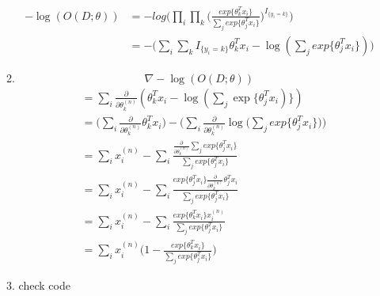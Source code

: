 \documentclass[a4paper]{article}
\begin{document}
\begin{enumerate}
\begin{enumerate}
\begin{align*}
		-\log(O(D; \theta)) & = -log\bigg(\prod_i \prod_k \bigg(\frac{exp\{ \theta_k^T x_i\}}{\sum_j exp\{\theta_j^T x_i\}} \bigg)^{I_{\{y_i = k\}}} \bigg)\\
		& = -\bigg(  \sum_i \sum_k I_{\{y_i = k\}}\theta_k^T x_i - \log( \sum_j exp\{\theta_j^T x_i\} ) \bigg)
	\end{align*}
	\item 
	\begin{equation*}
		\nabla -\log(O(D;\theta))
	\end{equation*}
	\begin{align*}
		& = \sum_i \frac{\partial}{\partial \theta_k^{(n)}} (\theta_k^T x_i - \log (\sum_j \exp \{ \theta_j^T x_i) \} )\\
		& = \bigg( \sum_i \frac{\partial}{\partial \theta_k^{(n)}} \theta_k^T x_i \bigg) - \bigg( \sum_i \frac{\partial}{\partial \theta_k^{(n)}} \log\big( \sum_j exp\{ \theta_j^T x_i \} \big) \bigg)\\
		& = \sum_i x_i^{(n)} - \sum_i \frac{\frac{\partial}{\partial \theta_k^{(n)}} \sum_j exp \{\theta_j^T x_i \} }{\sum_j exp \{\theta_j^T x_i \}}\\
		& = \sum_i x_i^{(n)} - \sum_i \frac{  exp \{\theta_j^T x_i \} \frac{\partial}{\partial \theta_k^{(n)}} \theta_j^T x_i }{\sum_j exp \{\theta_j^T x_i \}}\\
		& = \sum_i x_i^{(n)} - \sum_i \frac{exp \{\theta_k^T x_i \} x_i^{(n)}}{\sum_j exp \{\theta_j^T x_i \}}\\
		& = \sum_i x_i^{(n)} \bigg( 1 - \frac{exp \{\theta_k^T x_i \}}{\sum_j exp \{\theta_j^T x_i \}} \bigg)
	\end{align*}
	\item check code
	\end{enumerate}
\end{enumerate}
\end{document}
